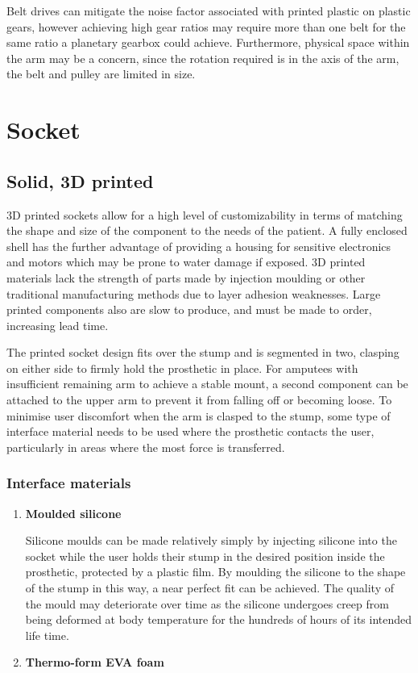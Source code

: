 \documentclass[12pt,3p]{report}
\begin{document}
\begin{multicols}{2}
\begin{enumerate}
{Belt drives can mitigate the noise factor associated with printed plastic on plastic gears, however achieving high gear ratios may require more than one belt for the same ratio a planetary gearbox could achieve. Furthermore, physical space within the arm may be a concern, since the rotation required is in the axis of the arm, the belt and pulley are limited in size.
			}	
			\end{enumerate}


	
	
	\section{Socket}
		
		\subsection{Solid, 3D printed}
		3D printed sockets allow for a high level of customizability in terms of matching the shape and size of the component to the needs of the patient. A fully enclosed shell has the further advantage of providing a housing for sensitive electronics and motors which may be prone to water damage if exposed. 3D printed materials lack the strength of parts made by injection moulding or other traditional manufacturing methods due to layer adhesion weaknesses. Large printed components also are slow to produce, and must be made to order, increasing lead time.
		
		The printed socket design fits over the stump and is segmented in two, clasping on either side to firmly hold the prosthetic in place. For amputees with insufficient remaining arm to achieve a stable mount, a second component can be attached to the upper arm to prevent it from falling off or becoming loose. To minimise user discomfort when the arm is clasped to the stump, some type of interface material needs to be used where the prosthetic contacts the user, particularly in areas where the most force is transferred.
		
			\subsubsection{Interface materials}		
		\begin{enumerate}
		\item \textbf{Moulded silicone} {
		
		Silicone moulds can be made relatively simply by injecting silicone into the socket while the user holds their stump in the desired position inside the prosthetic, protected by a plastic film. By moulding the silicone to the shape of the stump in this way, a near perfect fit can be achieved. The quality of the mould may deteriorate over time as the silicone undergoes creep from being deformed at body temperature for the hundreds of hours of its intended life time. 
		}
		\item \textbf{Thermo-form EVA foam} {
		 
}
\end{enumerate}
\end{multicols}
\end{document}
